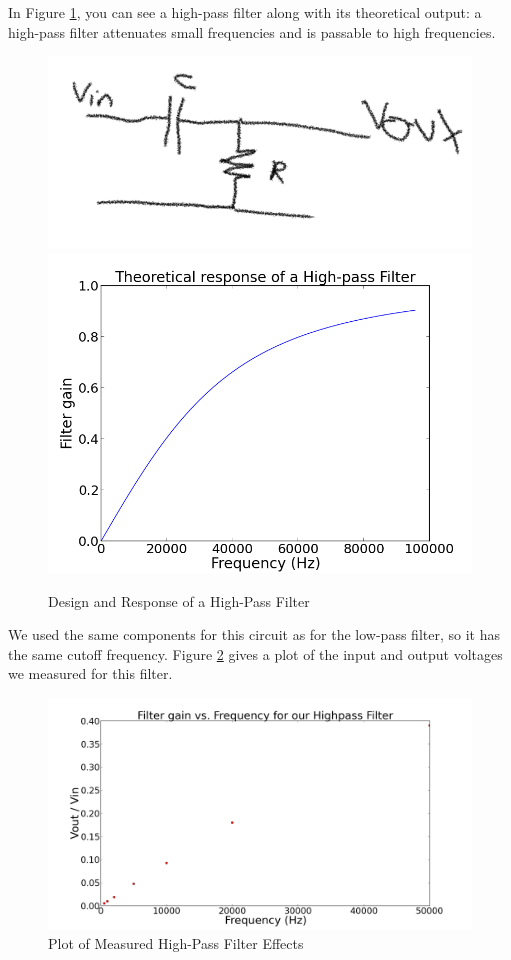 \documentclass[11pt]{article}
\begin{document}
In Figure \ref{HPFD}, you can see a high-pass filter
along with its theoretical output: a high-pass filter attenuates small frequencies and is passable to high frequencies.
\begin{figure}
\centering
\includegraphics[scale=0.25]{hpcircuit}
\includegraphics[scale=0.4]{highpass}
\caption{Design and Response of a High-Pass Filter \label{HPFD}}
\end{figure}
We used the same components for this circuit as for the low-pass filter, so it has the same cutoff frequency.
Figure \ref{HPFR} gives a plot of the input and output voltages we measured for this filter. 
\begin{figure}
\includegraphics[scale=0.3]{hpresplot}
\caption{Plot of Measured High-Pass Filter Effects \label{HPFR}}
\end{figure}
\end{document}
